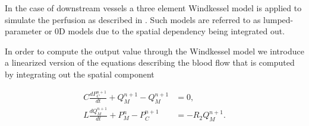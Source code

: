 \documentclass[a4paper, oneside]{discothesis}
\begin{document}
In the case of downstream vessels a three element Windkessel model is applied to simulate the perfusion as described in \cite{CiCP-4-317}.
Such models are referred to as lumped-parameter or 0D models due to the spatial dependency being integrated out.

In order to compute the output value through the Windkessel model we introduce a linearized version of the equations describing the blood flow that is computed by integrating out the spatial component

\begin{align}
	C\frac{d P_C^{n+1}}{d t}+Q_{M}^{n+1}-Q_M^{n+1}&=0, \label{eq:RLC1}\\
	{L}{\frac{d Q_M^{n+1}}{d t}}+P_{M}^n-P_C^{n+1}&=-R_2 Q_{M}^{n+1} \label{eq:RLC2}.
\end{align}
\end{document}
